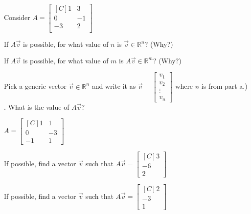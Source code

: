 \begin{exercise} Consider
$A=\begin{bmatrix*}[C]
1 & 3  \\
0 & -1 \\
-3 & 2 \\ 
\end{bmatrix*}$\\
\begin{inparaenum}[a.)]
\item If $A\vec{v}$ is possible, for what value of $n$ is 
$\vec{v} \in \mathbb{R}^n$? (Why?)\\
%
\item If $A\vec{v}$ is possible, for what value of $m$ is 
$A\vec{v} \in \mathbb{R}^m$? (Why?)\\
%
\item Pick a generic vector $\vec{v} \in \mathbb{R}^n$ and write it as 
$\vec{v}=\begin{bmatrix}v_1 \\ v_2 \\ \vdots \\ v_n\end{bmatrix}$ where $n$ is from part a.) . What is the value of $A\vec{v}$?
\end{inparaenum}
\end{exercise}

\begin{exercise}
$A=\begin{bmatrix*}[C]
1 & 1  \\
0 & -3  \\
-1 & 1  
\end{bmatrix*}$\\
\begin{inparaenum}
\item If possible, find a vector $\vec{v}$ such that 
$A\vec{v}=\begin{bmatrix*}[C] 3 \\ -6 \\ 2\end{bmatrix*}$\\
%
\item If possible, find a vector $\vec{v}$ such that 
$A\vec{v}=\begin{bmatrix*}[C] 2 \\ -3 \\ 1\end{bmatrix*}$\\
\end{inparaenum}
\end{exercise}

